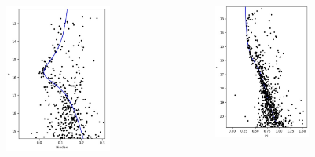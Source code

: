 \documentclass{beamer}
\begin{document}
\begin{frame}
\begin{columns}
\begin{column}{0.333\textwidth}
\begin{figure}
                    \includegraphics[width=0.8\textwidth]{pictures/Isoh2.jpg}
                \end{figure}
            \end{column}
            \begin{column}{0.333\textwidth}
                \begin{figure}
                    \centering
                    \includegraphics[width=0.75\textwidth]{pictures/Isoh3.jpg}

\end{figure}
\end{column}
\end{columns}
\end{frame}
\end{document}
